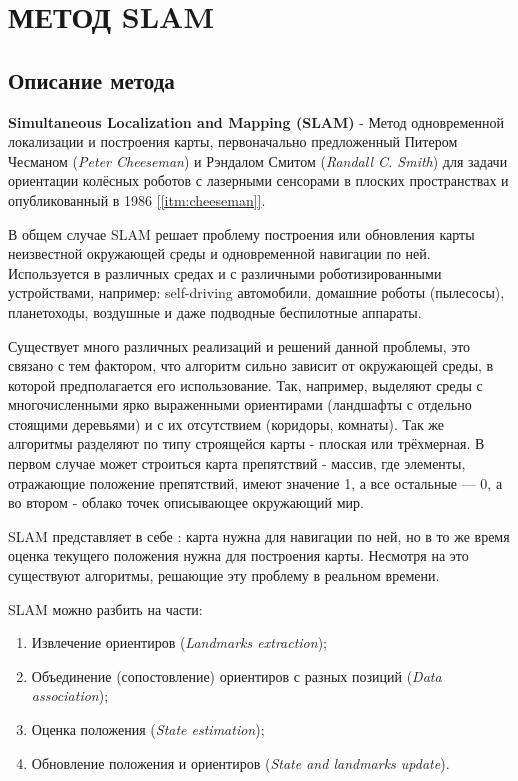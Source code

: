 \chapter{МЕТОД SLAM}

\section{Описание метода}

\textbf{Simultaneous Localization and Mapping (SLAM)} - Метод одновременной локализации и построения карты, первоначально предложенный Питером Чесманом (\textit{Peter Cheeseman}) и Рэндалом Смитом (\textit{Randall C. Smith}) для задачи ориентации колёсных роботов с лазерными сенсорами в плоских пространствах и опубликованный в 1986 \hyperref[itm:cheeseman]{[\ref{itm:cheeseman}]}.

В общем случае SLAM решает проблему построения или обновления карты неизвестной окружающей среды и одновременной навигации по ней. Используется в различных средах и с различными роботизированными устройствами, например: self-driving автомобили, домашние роботы (пылесосы), планетоходы, воздушные и даже подводные беспилотные аппараты.

Существует много различных реализаций и решений данной проблемы, это связано с тем фактором, что алгоритм сильно зависит от окружающей среды, в которой предполагается его использование. Так, например, выделяют среды с многочисленными ярко выраженными ориентирами (ландшафты с отдельно стоящими деревьями) и с их отсутствием (коридоры, комнаты). Так же алгоритмы разделяют по типу строящейся карты - плоская или трёхмерная. В первом случае может строиться карта препятствий - массив, где элементы, отражающие положение препятствий, имеют значение 1, а все остальные — 0, а во втором - облако точек описывающее окружающий мир.

SLAM представляет в себе : карта нужна для навигации по ней, но в то же время оценка текущего положения нужна для построения карты. Несмотря на это существуют алгоритмы, решающие эту проблему в реальном времени.

SLAM можно разбить на части:
\begin{enumerate}
    \item Извлечение ориентиров (\textit{Landmarks extraction});
    \item Объединение (сопостовление) ориентиров с разных позиций (\textit{Data association});
    \item Оценка положения (\textit{State estimation});
    \item Обновление положения и ориентиров (\textit{State and landmarks update}).
\end{enumerate}

